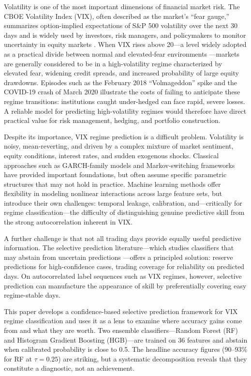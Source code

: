 \documentclass[12pt]{article}
\begin{document}
Volatility is one of the most important dimensions of financial market risk. The CBOE Volatility Index (VIX), often described as the market's ``fear gauge,'' summarizes option-implied expectations of S\&P 500 volatility over the next 30 days and is widely used by investors, risk managers, and policymakers to monitor uncertainty in equity markets \citep{whaley2009}. When VIX rises above 20---a level widely adopted as a practical divide between normal and elevated-fear environments \citep{whaley2009}---markets are generally considered to be in a high-volatility regime characterized by elevated fear, widening credit spreads, and increased probability of large equity drawdowns. Episodes such as the February 2018 ``Volmageddon'' spike and the COVID-19 crash of March 2020 illustrate the costs of failing to anticipate these regime transitions: institutions caught under-hedged can face rapid, severe losses. A reliable model for predicting high-volatility regimes would therefore have direct practical value for risk management, hedging, and portfolio construction.

Despite its importance, VIX regime prediction is a difficult problem. Volatility is noisy, mean-reverting, and driven by a complex mixture of market sentiment, equity conditions, interest rates, and sudden exogenous shocks. Classical approaches such as GARCH-family models \citep{bollerslev1986} and Markov-switching frameworks \citep{hamilton1989} have provided important foundations, but often assume specific parametric structures that may not hold in practice. Machine learning methods offer flexibility in modeling nonlinear interactions across large feature sets, but introduce their own challenges: temporal leakage, calibration, and---critically for regime classification---the difficulty of distinguishing genuine predictive skill from the strong autocorrelation inherent in VIX.

A further challenge is that not all trading days provide equally useful predictive information. The selective prediction literature---which studies classifiers that may abstain from uncertain predictions \citep{chow1970, bartlett2008, geifman2017}---offers a principled solution: reserve predictions for high-confidence cases, trading coverage for reliability on predicted days. On autocorrelated label sequences such as VIX regimes, however, selective prediction can manufacture the appearance of skill by preferentially covering easy regime-stable days.

This paper develops a confidence-based selective prediction framework for VIX regime classification and uses it as a lens to examine where accuracy gains come from and what they are worth. Two ensemble classifiers---Random Forest (RF) and Histogram Gradient Boosting (HGB)---are trained on 36 features and abstain when calibrated probability is close to 0.5. The headline accuracy figures (90--93\% for RF at $\tau = 0.25$) are striking, but a systematic decomposition reveals that they constitute a diagnostic, not an achievement.
\end{document}
